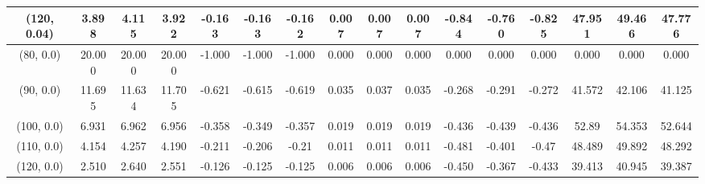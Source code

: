 \documentclass[preprint,12pt,1p]{elsarticle}
\begin{document}
\begin{table}[!h]
\begin{center}
{\begin{tabular}{| c | c | c | c | c | c | c| c| c| c| c| c| c| c| c| c|}
(120, 0.04)& 3.898 & 4.115 & 3.922 & -0.163 & -0.163 & -0.162 & 0.007 & 0.007 & 0.007 & -0.844 & -0.760 & -0.825 & 47.951 & 49.466 & 47.776 \\ \hline 
(80, 0.0)&  20.000 & 20.000 & 20.000& -1.000 & -1.000 & -1.000 & 0.000 & 0.000 & 0.000 & 0.000 & 0.000 & 0.000 & 0.000 & 0.000 & 0.000 \\ \hline    
(90, 0.0)&  11.695 & 11.634 & 11.705 & -0.621 & -0.615 & -0.619 & 0.035 & 0.037 & 0.035 & -0.268 & -0.291 & -0.272 & 41.572 & 42.106 & 41.125 \\ \hline    
(100, 0.0)&  6.931 & 6.962 & 6.956 & -0.358 & -0.349 & -0.357 & 0.019 & 0.019 & 0.019 & -0.436 & -0.439 & -0.436 & 52.89 & 54.353 & 52.644 \\ \hline    
(110, 0.0)&  4.154 & 4.257 & 4.190 & -0.211 & -0.206 & -0.21 & 0.011 & 0.011 & 0.011 & -0.481 & -0.401 & -0.47 & 48.489 & 49.892 & 48.292  \\ \hline    
(120, 0.0)&  2.510 & 2.640 & 2.551 & -0.126 & -0.125 & -0.125 & 0.006 & 0.006 & 0.006 & -0.450 & -0.367 & -0.433 & 39.413 & 40.945 & 39.387  \\ \hline  
\end{tabular}}
\end{center}
\end{table}
\end{document}
